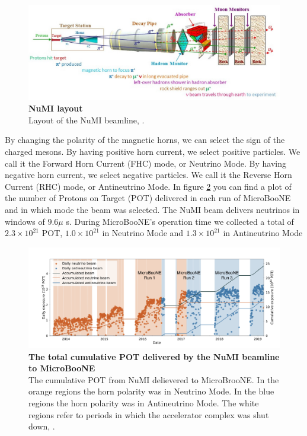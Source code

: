 \begin{figure}[h!]
    \centering
    \includegraphics[width=140mm]{Figures/numi.jpg}
    \caption[NuMI layout]{{\textbf{NuMI layout}} \\Layout of the NuMI beamline, \cite{numi}.}
    \label{fig:numi}
\end{figure}

By changing the polarity of the magnetic horns, we can select the sign of the charged mesons. By having positive horn current, we select positive particles. We call it the Forward Horn Current (FHC) mode, or Neutrino Mode. By having negative horn current, we select negative particles. We call it the Reverse Horn Current (RHC) mode, or Antineutrino Mode. In figure \ref{beam_mode_uboone} you can find a plot of the number of Protons on Target (POT) delivered in each run of MicroBooNE and in which mode the beam was selected. The NuMI beam delivers neutrinos in windows of $9.6 \mu$ s. During MicroBooNE's operation time we collected a total of $2.3\times 10^{21}$ POT, $1.0\times10^{21}$ in Neutrino Mode and $1.3\times10^{21}$ in Antineutrino Mode

\begin{figure}[h!]
    \centering
    \includegraphics[width=150mm]{Figures/beam_mode_uboone.png}
    \caption[The total cumulative POT delivered by the NuMI beamline to MicroBooNE]{{\textbf{The total cumulative POT delivered by the NuMI beamline to MicroBooNE}}\\The cumulative POT from NuMI delievered to MicroBrooNE. In the orange regions the horn polarity was in Neutrino Mode. In the blue regions the horn polarity was in Antineutrino Mode. The white regions refer to periods in which the accelerator complex was shut down, \cite{krish_phd}.}
    \label{beam_mode_uboone}
\end{figure}

